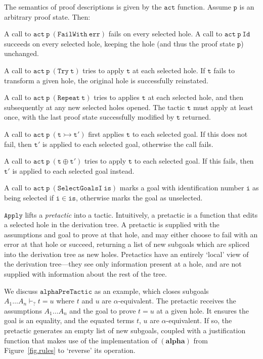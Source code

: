 \documentclass{llncs}
\newcommand{\rulefont}[1]{\ensuremath{(\mathbf{#1})}}
\begin{document}
The semantics of proof descriptions is given by the $\mathtt{act}$ function.
Assume $\mathtt{p}$ is an arbitrary proof state.
Then:
\begin{itemize*}
\item
A call to $\mathtt{act\ p\ (FailWith\ err)}$ fails on every selected hole.
A call to $\mathtt{act\ p\ Id}$ succeeds on every selected hole, keeping the hole (and thus the proof state $\mathtt{p}$) unchanged.
\item
A call to $\mathtt{act\ p\ (Try\ t)}$ tries to apply $\mathtt{t}$ at each selected hole.
If $\mathtt{t}$ fails to transform a given hole, the original hole is successfully reinstated.
\item
A call to $\mathtt{act\ p\ (Repeat\ t)}$ tries to applies $\mathtt{t}$ at each selected hole, and then subsequently at any new selected holes opened.
The tactic $\mathtt{t}$ must apply at least once, with the last proof state successfully modified by $\mathtt{t}$ returned.
\item
A call to $\mathtt{act\ p\ (t \rightarrowtail t')}$ first applies $\mathtt{t}$ to each selected goal.
If this does not fail, then $\mathtt{t'}$ is applied to each selected goal, otherwise the call fails.
\item
A call to $\mathtt{act\ p\ (t \oplus t')}$ tries to apply $\mathtt{t}$ to each selected goal.
If this fails, then $\mathtt{t'}$ is applied to each selected goal instead.
\item
A call to $\mathtt{act\ p\ (SelectGoalsI\ is)}$ marks a goal with identification number $\mathtt{i}$ as being selected if $\mathtt{i \in is}$, otherwise marks the goal as unselected.
\end{itemize*}
$\mathtt{Apply}$ lifts a \emph{pretactic} into a tactic.
Intuitively, a pretactic is a function that edits a selected hole in the derivation tree.
A pretactic is supplied with the assumptions and goal to prove at that hole, and may either choose to fail with an error at that hole or succeed, returning a list of new subgoals which are spliced into the derivation tree as new holes.
Pretactics have an entirely `local' view of the derivation tree---they see only information present at a hole, and are not supplied with information about the rest of the tree.

We discuss $\mathtt{alphaPreTactic}$ as an example, which closes subgoals $A_1 \ldots A_n \vdash_? t = u$ where $t$ and $u$ are $\alpha$-equivalent.
The pretactic receives the assumptions $A_1 \ldots A_n$ and the goal to prove $t = u$ at a given hole.
It ensures the goal is an equality, and the equated terms $t$, $u$ are $\alpha$-equivalent.
If so, the pretactic generates an empty list of new subgoals, coupled with a justification function that makes use of the implementation of \rulefont{alpha} from Figure~\ref{fig.rules} to `reverse' its operation.
\end{document}
